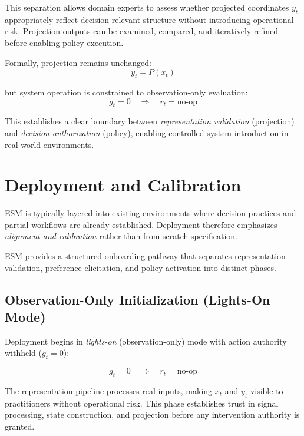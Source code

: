 \documentclass[11pt]{article}
\begin{document}
This separation allows domain experts to assess whether projected coordinates $y_t$ appropriately reflect decision-relevant structure without introducing operational risk. Projection outputs can be examined, compared, and iteratively refined before enabling policy execution.

Formally, projection remains unchanged:
\begin{equation}
y_t = P(x_t)
\end{equation}

but system operation is constrained to observation-only evaluation:
\begin{equation}
g_t = 0 \quad \Rightarrow \quad r_t = \mathrm{no\text{-}op}
\end{equation}

This establishes a clear boundary between \emph{representation validation} (projection) and \emph{decision authorization} (policy), enabling controlled system introduction in real-world environments.

\section{Deployment and Calibration}
\label{sec:deployment}

ESM is typically layered into existing environments where decision practices and partial workflows are already established. Deployment therefore emphasizes \emph{alignment and calibration} rather than from-scratch specification.

ESM provides a structured onboarding pathway that separates representation validation, preference elicitation, and policy activation into distinct phases.

\subsection{Observation-Only Initialization (Lights-On Mode)}

Deployment begins in \emph{lights-on} (observation-only) mode with action authority withheld ($g_t = 0$):

\begin{equation}
g_t = 0 \quad \Rightarrow \quad r_t = \mathrm{no\text{-}op}
\end{equation}

The representation pipeline processes real inputs, making $x_t$ and $y_t$ visible to practitioners without operational risk. This phase establishes trust in signal processing, state construction, and projection before any intervention authority is granted.
\end{document}
